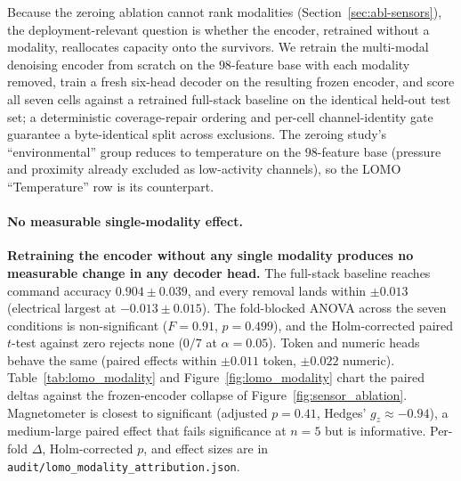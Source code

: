\documentclass[sensors,article,submit,moreauthors,pdftex]{Definitions/mdpi}
\begin{document}
Because the zeroing ablation cannot rank modalities (Section~\ref{sec:abl-sensors}), the deployment-relevant question is whether the encoder, retrained without a modality, reallocates capacity onto the survivors. We retrain the multi-modal denoising encoder from scratch on the $98$-feature base with each modality removed, train a fresh six-head decoder on the resulting frozen encoder, and score all seven cells against a retrained full-stack baseline on the identical held-out test set; a deterministic coverage-repair ordering and per-cell channel-identity gate guarantee a byte-identical split across exclusions. The zeroing study's ``environmental'' group reduces to temperature on the $98$-feature base (pressure and proximity already excluded as low-activity channels), so the LOMO ``Temperature'' row is its counterpart.

\paragraph{No measurable single-modality effect.} \textbf{Retraining the encoder without any single modality produces no measurable change in any decoder head.} The full-stack baseline reaches command accuracy $0.904 \pm 0.039$, and every removal lands within $\pm 0.013$ (electrical largest at $-0.013 \pm 0.015$). The fold-blocked ANOVA across the seven conditions is non-significant ($F=0.91$, $p=0.499$), and the Holm-corrected paired $t$-test against zero rejects none ($0/7$ at $\alpha=0.05$). Token and numeric heads behave the same (paired effects within $\pm 0.011$ token, $\pm 0.022$ numeric). Table~\ref{tab:lomo_modality} and Figure~\ref{fig:lomo_modality} chart the paired deltas against the frozen-encoder collapse of Figure~\ref{fig:sensor_ablation}. Magnetometer is closest to significant (adjusted $p=0.41$, Hedges' $g_z \approx -0.94$), a medium-large paired effect that fails significance at $n\!=\!5$ but is informative. Per-fold $\Delta$, Holm-corrected $p$, and effect sizes are in \texttt{audit/lomo\_modality\_attribution.json}.


\end{document}
